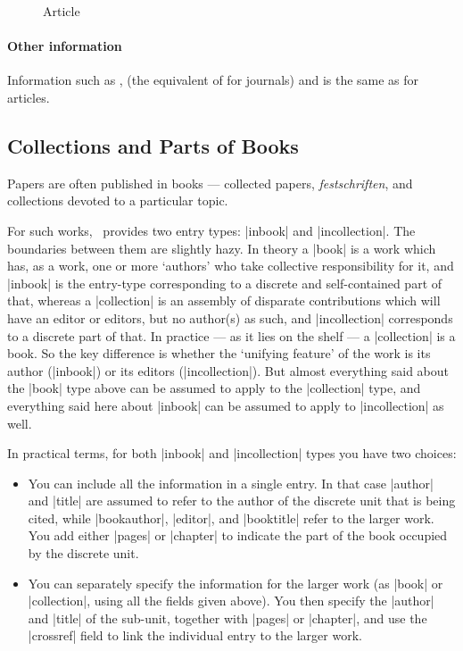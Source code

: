 \begin{figure}
  \caption{Article\label{mueck2}}
\end{figure} 

\paragraph{Other information} Information such as ,
 (the equivalent of  for journals) and
 is the same as for articles.

\subsection{Collections and Parts of Books}

Papers are often published in books --- collected papers,
\emph{festschriften}, and collections devoted to a particular topic.

For such works, \biblatex\ provides two entry types: |inbook| and
|incollection|.\label{inbook:vs:incollection} The boundaries between
them are slightly hazy. In theory a |book| is a work which has, as a
work, one or more `authors' who take collective responsibility for it,
and |inbook| is the entry-type corresponding to a discrete and
self-contained part of that, whereas a |collection| is an assembly of
disparate contributions which will have an editor or editors, but no
author(s) as such, and |incollection| corresponds to a discrete part
of that. In practice --- as it lies on the shelf --- a |collection| is
a book. So the key difference is whether the `unifying feature' of the
work is its author (|inbook|) or its editors (|incollection|). But
almost everything said about the |book| type above can be assumed to
apply to the |collection| type, and everything said here about
|inbook| can be assumed to apply to |incollection| as well.

In practical terms, for both |inbook| and |incollection| types you
have two choices:
\begin{itemize}
\item You can include all the information in a single entry. In that
  case |author| and |title| are assumed to refer to the author of the
  discrete unit that is being cited, while |bookauthor|, |editor|, and
  |booktitle| refer to the larger work. You add either |pages| or
  |chapter| to indicate the part of the book occupied by the discrete
  unit.
\item You can separately specify the information for the larger work
  (as |book| or |collection|, using all the fields given above). You
  then specify the |author| and |title| of the sub-unit, together with
  |pages| or |chapter|, and use the |crossref| field to link the
  individual entry to the larger work.
\end{itemize}


